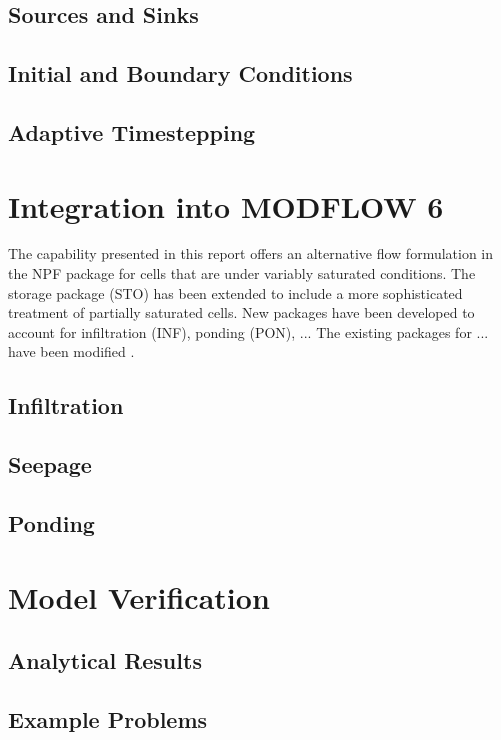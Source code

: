 \documentclass[fleqn]{article}
\begin{document}
\subsection{Sources and Sinks}
\subsection{Initial and Boundary Conditions}
\subsection{Adaptive Timestepping}

\section{Integration into MODFLOW 6}
The capability presented in this report offers an alternative flow
formulation in the NPF package for cells that are under variably 
saturated conditions. The storage package (STO) has been extended
to include a more sophisticated treatment of partially saturated
cells. New packages have been developed to account for infiltration (INF),
ponding (PON), ... The existing packages for ... have been modified .

\subsection{Infiltration}
\subsection{Seepage}
\subsection{Ponding}

\section{Model Verification}
\subsection{Analytical Results}
\subsection{Example Problems}

\appendix
\end{document}
